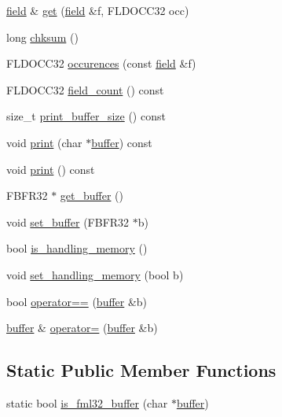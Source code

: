 \begin{DoxyCompactItemize}
\item 
\hyperlink{classatmi_1_1field}{field} \& \hyperlink{classatmi_1_1buffer_a864adb4d0153e6be38a7905c994915e1}{get} (\hyperlink{classatmi_1_1field}{field} \&f, F\+L\+D\+O\+C\+C32 occ)
\item 
long \hyperlink{classatmi_1_1buffer_a4ae9fa419098eb136ae3681ad90ccafb}{chksum} ()
\item 
F\+L\+D\+O\+C\+C32 \hyperlink{classatmi_1_1buffer_a57ff1b2ed449d59d4ec936e9e79a5d1a}{occurences} (const \hyperlink{classatmi_1_1field}{field} \&f)
\item 
F\+L\+D\+O\+C\+C32 \hyperlink{classatmi_1_1buffer_a74a6ff6ab31eb1128fc2f40d2a8e020f}{field\+\_\+count} () const 
\item 
size\+\_\+t \hyperlink{classatmi_1_1buffer_ae315c028b78f321abce6d9be2e026813}{print\+\_\+buffer\+\_\+size} () const 
\item 
void \hyperlink{classatmi_1_1buffer_ad7b1a3f9005926e07d00393aa6300f39}{print} (char $\ast$\hyperlink{classatmi_1_1buffer}{buffer}) const 
\item 
void \hyperlink{classatmi_1_1buffer_aa5f087559f5f3fb4f383121f78f2c461}{print} () const 
\item 
F\+B\+F\+R32 $\ast$ \hyperlink{classatmi_1_1buffer_aa9aa5382717ed17a2047db2779f8f0ec}{get\+\_\+buffer} ()
\item 
void \hyperlink{classatmi_1_1buffer_ade8853e7c2ae10dcd024b34049e99af3}{set\+\_\+buffer} (F\+B\+F\+R32 $\ast$b)
\item 
bool \hyperlink{classatmi_1_1buffer_aae543cf7816b338d20031993c18ce491}{is\+\_\+handling\+\_\+memory} ()
\item 
void \hyperlink{classatmi_1_1buffer_a68f05d1dbd040062850feeba5aa188fc}{set\+\_\+handling\+\_\+memory} (bool b)
\item 
bool \hyperlink{classatmi_1_1buffer_aa095219e6aa1470c96dc2b3d4ddeeb98}{operator==} (\hyperlink{classatmi_1_1buffer}{buffer} \&b)
\item 
\hyperlink{classatmi_1_1buffer}{buffer} \& \hyperlink{classatmi_1_1buffer_a878220e2ba9a66a991c77b20fd52ff09}{operator=} (\hyperlink{classatmi_1_1buffer}{buffer} \&b)
\end{DoxyCompactItemize}
\subsection*{Static Public Member Functions}
\begin{DoxyCompactItemize}
\item 
static bool \hyperlink{classatmi_1_1buffer_a38aca9956db23474cb19d4c737b08262}{is\+\_\+fml32\+\_\+buffer} (char $\ast$\hyperlink{classatmi_1_1buffer}{buffer})
\end{DoxyCompactItemize}
